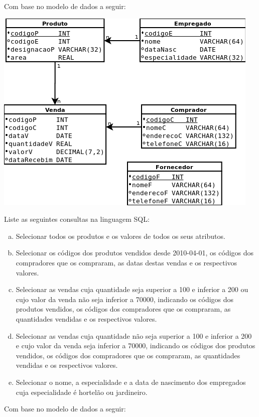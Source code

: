 
 Com base no modelo de dados a seguir:

\begin{center}
  \includegraphics[scale=.5]{../varejao.png}
\end{center}

Liste as seguintes consultas na linguagem SQL:

\begin{enumerate}[a)]
\item Selecionar todos os produtos e os valores de todos os seus atributos.
\item Selecionar os códigos dos produtos vendidos desde 2010-04-01, os códigos dos compradores que os compraram, as datas destas vendas e os respectivos valores.
\item Selecionar as vendas cuja quantidade seja superior a 100 e inferior a 200 ou cujo valor da venda não seja inferior a 70000, indicando os códigos dos produtos vendidos, os códigos dos compradores que os compraram, as quantidades vendidas e os respectivos valores.
\item Selecionar as vendas cuja quantidade não seja superior a 100 e inferior a 200 e cujo valor da venda seja inferior a 70000, indicando os códigos dos produtos vendidos, os códigos dos compradores que os compraram, as quantidades vendidas e os respectivos valores.
\item Selecionar o nome, a especialidade e a data de nascimento dos empregados cuja especialidade é hortelão ou jardineiro.
\end{enumerate}

\pagebreak
{} Com base no modelo de dados a seguir:

